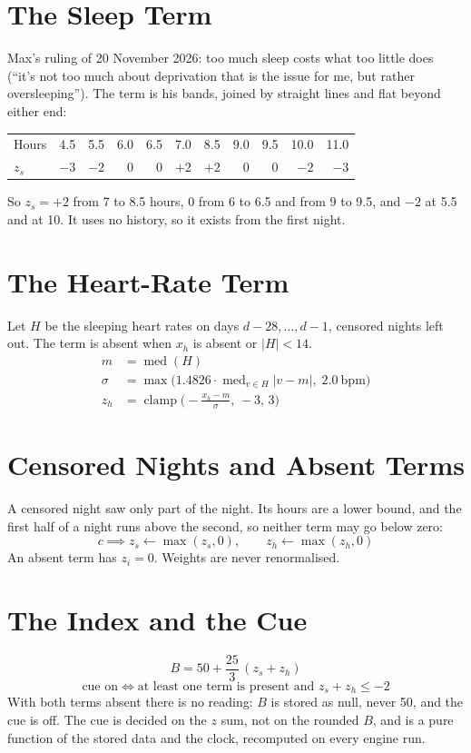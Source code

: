 \documentclass[11pt]{article}
\DeclareMathOperator{\clamp}{clamp}
\DeclareMathOperator{\med}{med}
\begin{document}
\section{The Sleep Term}
Max's ruling of 20 November 2026: too much sleep costs what too little does
(``it's not too much about deprivation that is the issue for me, but rather
oversleeping''). The term is his bands, joined by straight lines and flat beyond
either end:
\begin{center}
\begin{tabular}{lrrrrrrrrrr}
\toprule
Hours & 4.5 & 5.5 & 6.0 & 6.5 & 7.0 & 8.5 & 9.0 & 9.5 & 10.0 & 11.0 \\
$z_s$ & $-3$ & $-2$ & 0 & 0 & $+2$ & $+2$ & 0 & 0 & $-2$ & $-3$ \\
\bottomrule
\end{tabular}
\end{center}
So $z_s = +2$ from 7 to 8.5 hours, 0 from 6 to 6.5 and from 9 to 9.5, and $-2$
at 5.5 and at 10. It uses no history, so it exists from the first night.

\section{The Heart-Rate Term}
Let $H$ be the sleeping heart rates on days $d-28, \dots, d-1$, censored nights
left out. The term is absent when $x_h$ is absent or $|H| < 14$.
\begin{align}
m &= \med(H) \\
\sigma &= \max\!\big(1.4826 \cdot \med_{v \in H} |v - m|,\; 2.0\ \text{bpm}\big) \\
z_h &= \clamp\!\Big(-\frac{x_h - m}{\sigma},\, -3,\, 3\Big)
\end{align}

\section{Censored Nights and Absent Terms}
A censored night saw only part of the night. Its hours are a lower bound, and the
first half of a night runs above the second, so neither term may go below zero:
\begin{equation}
c \implies z_s \leftarrow \max(z_s, 0), \qquad z_h \leftarrow \max(z_h, 0)
\end{equation}
An absent term has $z_i = 0$. Weights are never renormalised.

\section{The Index and the Cue}
\begin{equation}
B = 50 + \frac{25}{3}\,(z_s + z_h)
\end{equation}
\begin{equation}
\text{cue on} \iff \text{at least one term is present and } z_s + z_h \le -2
\end{equation}
With both terms absent there is no reading: $B$ is stored as null, never 50, and
the cue is off. The cue is decided on the $z$ sum, not on the rounded $B$, and is
a pure function of the stored data and the clock, recomputed on every engine run.
\end{document}
